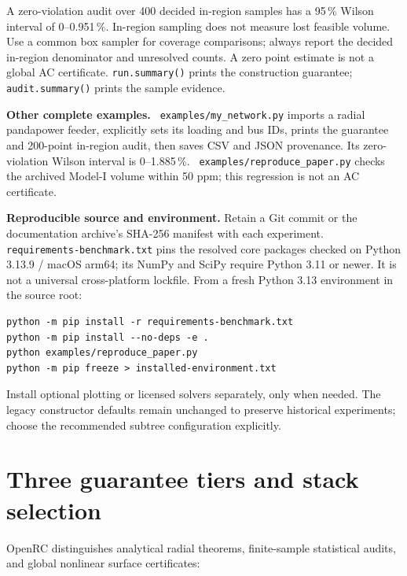 \documentclass[11pt,a4paper]{report}
\newcommand{\code}[1]{\texttt{\small #1}}
\newcommand{\file}[1]{\texttt{\small\color{nbgrey} #1}}
\begin{document}
A zero-violation audit over 400 decided in-region samples has a 95\,\%
Wilson interval of 0--0.951\,\%. In-region sampling does not measure lost
feasible volume. Use a common box sampler for coverage comparisons; always
report the decided in-region denominator and unresolved counts. A zero
point estimate is not a global AC certificate. \code{run.summary()} prints
the construction guarantee; \code{audit.summary()} prints the sample evidence.

\noindent\textbf{Other complete examples.}
\file{examples/my\_network.py} imports a radial pandapower feeder, explicitly
sets its loading and bus IDs, prints the guarantee and 200-point in-region
audit, then saves CSV and JSON provenance. Its zero-violation Wilson interval
is 0--1.885\,\%. \file{examples/reproduce\_paper.py} checks the archived
Model-I volume within 50 ppm; this regression is not an AC certificate.

\noindent\textbf{Reproducible source and environment.}
Retain a Git commit or the documentation archive's SHA-256 manifest with each
experiment. \file{requirements-benchmark.txt} pins the resolved core
packages checked on Python 3.13.9 / macOS arm64; its NumPy and SciPy require
Python 3.11 or newer. It is not a universal cross-platform lockfile. From a
fresh Python 3.13 environment in the source root:
\begin{lstlisting}[style=sh]
python -m pip install -r requirements-benchmark.txt
python -m pip install --no-deps -e .
python examples/reproduce_paper.py
python -m pip freeze > installed-environment.txt
\end{lstlisting}
Install optional plotting or licensed solvers separately, only when needed.
The legacy constructor defaults remain unchanged to preserve historical
experiments; choose the recommended subtree configuration explicitly.

\section*{Three guarantee tiers and stack selection}

OpenRC distinguishes analytical radial theorems, finite-sample statistical
audits, and global nonlinear surface certificates:
\end{document}
